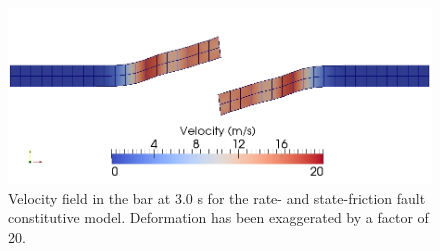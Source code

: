 \noindent \begin{center}
\begin{figure}
\begin{centering}
\includegraphics[scale=0.5]{tutorials/shearwave/figs/quad4ratestateageing30}
\par\end{centering}

\caption{Velocity field in the bar at 3.0 s for the rate- and state-friction
fault constitutive model. Deformation has been exaggerated by a factor
of 20.\label{fig:shearwave:quad4:ratestateageing}}
\end{figure}

\par\end{center}
